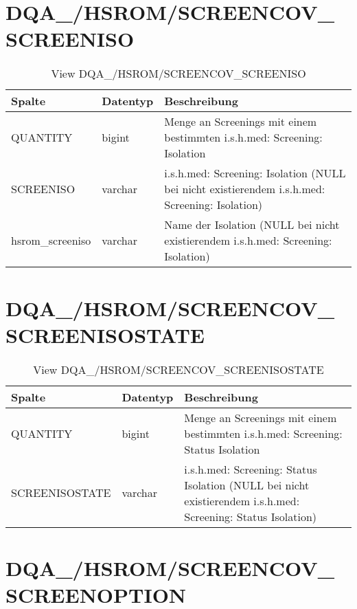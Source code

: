   \section{DQA\_/HSROM/SCREENCOV\_\\ SCREENISO}

  \begin{table}[ht]
    \centering
    \caption{View DQA\_/HSROM/SCREENCOV\_SCREENISO}
    \label{tab:dqa/hsrom/screencovscreeniso}
    \begin{tabular}{||l|l|p{10cm}||}
      \hline
      Spalte & Datentyp & Beschreibung \\ [0.5ex] \hline \hline
      QUANTITY & bigint & Menge an Screenings mit einem bestimmten i.s.h.med: Screening: Isolation \\ \hline
      SCREENISO & varchar & i.s.h.med: Screening: Isolation (NULL bei nicht existierendem i.s.h.med: Screening: Isolation)\\ \hline
      hsrom\_screeniso & varchar & Name der Isolation (NULL bei nicht existierendem i.s.h.med: Screening: Isolation)\\ \hline
    \end{tabular}
  \end{table}

 \clearpage

  \section{DQA\_/HSROM/SCREENCOV\_\\ SCREENISOSTATE}

  \begin{table}[ht]
    \centering
    \caption{View DQA\_/HSROM/SCREENCOV\_SCREENISOSTATE}
    \label{tab:dqa/hsrom/screencovscreenisostate}
    \begin{tabular}{||l|l|p{10cm}||}
      \hline
      Spalte & Datentyp & Beschreibung \\ [0.5ex] \hline \hline
      QUANTITY & bigint & Menge an Screenings mit einem bestimmten i.s.h.med: Screening: Status Isolation \\ \hline
      SCREENISOSTATE & varchar & i.s.h.med: Screening: Status Isolation (NULL bei nicht existierendem i.s.h.med: Screening: Status Isolation)\\ \hline
    \end{tabular}
  \end{table}

  \section{DQA\_/HSROM/SCREENCOV\_\\ SCREENOPTION}

